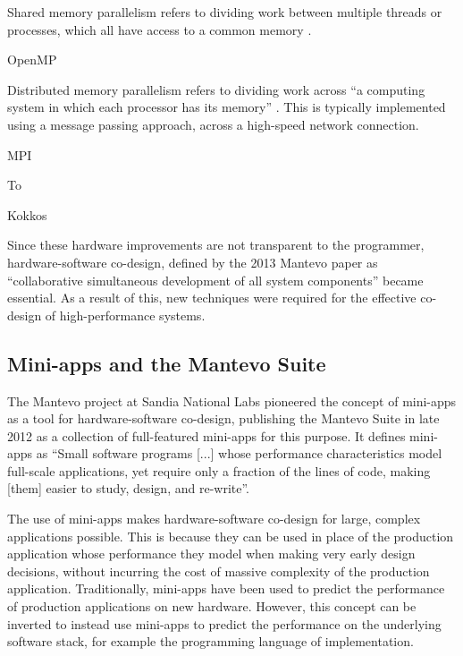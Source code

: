 Shared memory parallelism refers to dividing work between multiple threads or processes, which all have access to a common memory  \cite{SharedMemoryParallelism}.


OpenMP \cite{dagumOpenMPIndustryStandard1998}


Distributed memory parallelism refers to dividing work across ``a computing system in which each processor has its memory'' \cite{pardo2021modeling}. This is typically implemented using a message passing approach, across a high-speed network connection.

MPI

To

Kokkos \cite{edwardsKokkosEnablingPerformance2013}


Since these hardware improvements are not transparent to the programmer, hardware-software co-design, defined by the 2013 Mantevo paper as ``collaborative simultaneous development of all system components'' \cite{heroux2013mantevo} became essential. As a result of this, new techniques were required for the effective co-design of high-performance systems.

\subsection{Mini-apps and the Mantevo Suite}
\label{ssec:miniapps-mantevo} %

The Mantevo project at Sandia National Labs pioneered the concept of mini-apps as a tool for hardware-software co-design, publishing the Mantevo Suite in late 2012 as a collection of full-featured mini-apps for this purpose. It defines mini-apps as ``Small software programs [...] whose performance characteristics model full-scale applications, yet require only a fraction of the lines of code, making [them] easier to study, design, and re-write''.

The use of mini-apps makes hardware-software co-design for large, complex applications possible. This is because they can be used in place of the production application whose performance they model when making very early design decisions, without incurring the cost of massive complexity of the production application. Traditionally, mini-apps have been used to predict the performance of production applications on new hardware. However, this concept can be inverted to instead use mini-apps to predict the performance on the underlying software stack, for example the programming language of implementation.


